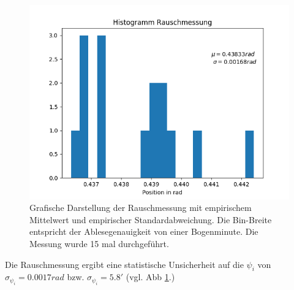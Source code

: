 \documentclass[12pt,a4paper]{article}
\begin{document}
	\begin{figure}
		\includegraphics[scale=1.0]{Bilder/HistRauschen.png}
		\caption{Grafische Darstellung der Rauschmessung mit empirischem Mittelwert und empirischer Standardabweichung. Die Bin-Breite entspricht der Ablesegenauigkeit von einer Bogenminute. Die Messung wurde 15 mal durchgeführt.}
		\label{fig:HistRauschen}
	\end{figure}
	
	Die Rauschmessung ergibt eine statistische Unsicherheit auf die $\psi_i$ von $\sigma_{\psi_i} = 0.0017 rad$ bzw. $\sigma_{\psi_i} = 5.8'$ (vgl. Abb \ref{fig:HistRauschen}.)
	
\end{document}
